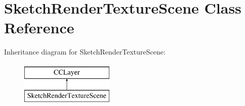 \hypertarget{interface_sketch_render_texture_scene}{\section{Sketch\-Render\-Texture\-Scene Class Reference}
\label{dc/d61/interface_sketch_render_texture_scene}
}
Inheritance diagram for Sketch\-Render\-Texture\-Scene\-:\begin{figure}[H]
\begin{center}
\leavevmode
\includegraphics[height=2.000000cm]{dc/d61/interface_sketch_render_texture_scene}
\end{center}
\end{figure}
